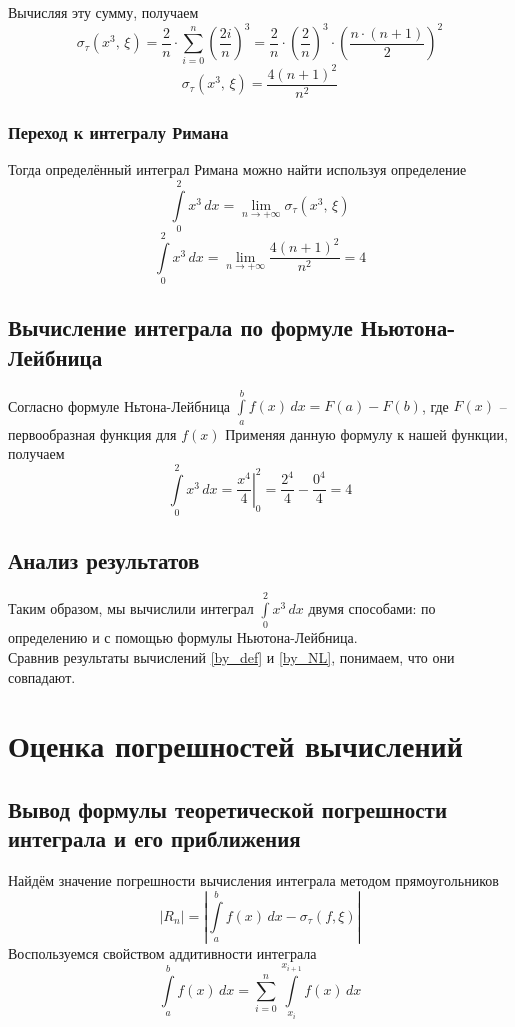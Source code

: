 \documentclass[a4paper, 11pt]{article}
\begin{document}
	Вычисляя эту сумму, получаем
	\begin{equation*}
		 \sigma_{\tau} (x^3, \, \xi) = \frac{2}{n} \cdot \sum\limits_{i=0}^n \left(\frac{2i}{n}\right)^3 = \frac{2}{n} \cdot \left(\frac{2}{n}\right)^3 \cdot \left(\frac{n \cdot (n+1)}{2}\right)^2 
	\end{equation*}
	\begin{equation}
		 \sigma_{\tau} (x^3, \, \xi) = \frac{4(n+1)^2}{n^2}
	\end{equation}
	\subsubsection{Переход к интегралу Римана}
	Тогда определённый интеграл Римана можно найти используя определение 
	\begin{equation}
		\int\limits_0^2 x^3 \,dx = \lim\limits_{n \to +\infty}  \sigma_{\tau} (x^3, \, \xi)
	\end{equation}
	\begin{equation}
		\int\limits_0^2 x^3 \,dx = \lim\limits_{n \to +\infty}  \frac{4(n+1)^2}{n^2} = 4 \label{by_def}
	\end{equation}
	
	\subsection{Вычисление интеграла по формуле Ньютона-Лейбница}
	Согласно формуле Ньтона-Лейбница $\int\limits_a^b f(x)\, dx = F(a) - F(b)$, где $F(x)$ -- первообразная функция для $f(x)$
	Применяя данную формулу к нашей функции, получаем
	\begin{equation}
		\int\limits_0^2 x^3 \, dx = \left. \frac{x^4}{4} \right|_0^2 = \frac{2^4}{4} - \frac{0^4}{4} = 4 \label{by_NL}
	\end{equation}
	\subsection{Анализ результатов}
	Таким образом, мы вычислили интеграл $\int\limits_0^2 x^3 \, dx$ двумя способами: по определению и с помощью формулы Ньютона-Лейбница.\\
	Сравнив результаты вычислений \ref{by_def} и \ref{by_NL}, понимаем, что они совпадают.
	
	\section{Оценка погрешностей вычислений}
	\subsection{Вывод формулы теоретической погрешности интеграла и его приближения}
	Найдём значение погрешности вычисления интеграла методом прямоугольников
	\begin{equation}
		\left|R_n\right| = \left| \int\limits_a^b f(x) \,dx - \sigma_{\tau}(f, \xi) \right|
	\end{equation}
	Воспользуемся свойством аддитивности интеграла
	\begin{equation}
		\int\limits_a^b f(x) \, dx = \sum_{i=0}^{n} \int\limits_{x_{i}}^{x_{i+1}} f(x) \, dx
	\end{equation}	
\end{document}
